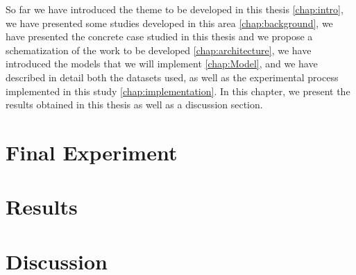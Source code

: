 \cleardoublepage
\label{chap:results}

So far we have introduced the theme to be developed in this thesis \ref{chap:intro}, we have presented some studies developed in this area \ref{chap:background}, we have presented the concrete case studied in this thesis and we propose a schematization of the work to be developed \ref{chap:architecture}, we have introduced the models that we will implement \ref{chap:Model}, and we have described in detail both the datasets used, as well as the experimental process implemented in this study \ref{chap:implementation}.
 In this chapter, we present the results obtained in this thesis as well as a discussion section.


\section{Final Experiment}

\section{Results}

\section{Discussion}

